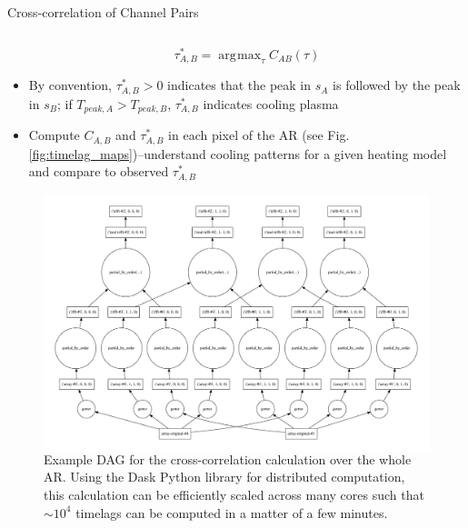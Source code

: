 \documentclass[final]{beamer}
\DeclareMathOperator*{\argmax}{\arg\!\max}
\begin{document}
\begin{frame}
\begin{columns}[T]
\begin{column}{0.49\linewidth}
\begin{block}{Cross-correlation of Channel Pairs}
\begin{columns}[c]
\begin{column}{0.49\columnwidth}
\begin{itemize}
                    \begin{equation}
                        \tau^*_{A,B} = \argmax_{\tau}C_{AB}(\tau)
                    \end{equation}
                    \item By convention, $\tau^*_{A,B}>0$ indicates that the peak in $s_A$ is followed by the peak in $s_B$; if $T_{peak,A}>T_{peak,B}$, $\tau^*_{A,B}$ indicates \alert{cooling} plasma
                    \item Compute $C_{A,B}$ and $\tau^*_{A,B}$ in each pixel of the AR (see Fig. \ref{fig:timelag_maps})--understand cooling patterns for a given heating model and compare to observed $\tau^*_{A,B}$
                \end{itemize}
                \begin{figure}
                    \begin{columns}[c]
                        \includegraphics[width=\columnwidth]{figures/timelag_dag.pdf}
                        \caption{Example DAG for the cross-correlation calculation over the whole AR. Using the Dask Python library \citep{dask_development_team_dask:_2016} for distributed computation, this calculation can be efficiently scaled across many cores such that $\sim10^4$ timelags can be computed in a matter of a few minutes.}
                    \end{columns}
                    \label{fig:timelag_dask_dag}
                \end{figure}
            \end{column}
        \end{columns}

\end{block}
\end{column}
\end{columns}
\end{frame}
\end{document}
